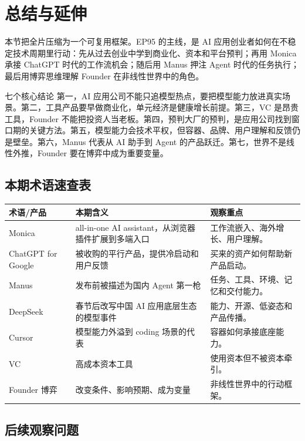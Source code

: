\documentclass[a4paper]{article}
\begin{document}
\section{总结与延伸}

本节把全片压缩为一个可复用框架。EP95 的主线，是 AI 应用创业者如何在不稳定技术周期里行动：先从过去创业中学到商业化、资本和平台预判；再用 Monica 承接 ChatGPT 时代的工作流机会；随后用 Manus 押注 Agent 时代的任务执行；最后用博弈思维理解 Founder 在非线性世界中的角色。

\begin{importantbox}{七个核心结论}
第一，AI 应用公司不能只追模型热点，要把模型能力放进真实场景。第二，工具产品要早做商业化，单元经济是健康增长前提。第三，VC 是昂贵工具，Founder 不能把投资人当老板。第四，预判大厂的预判，是应用公司找到窗口期的关键方法。第五，模型能力会技术平权，但容器、品牌、用户理解和反馈仍是壁垒。第六，Manus 代表从 AI 助手到 Agent 的产品跃迁。第七，世界不是线性外推，Founder 要在博弈中成为重要变量。
\end{importantbox}

\subsection{本期术语速查表}

\noindent\begin{tabularx}{\textwidth}{p{}p{}X}
\toprule
术语/产品 & 本期含义 & 观察重点 \\
\midrule
Monica & all-in-one AI assistant，从浏览器插件扩展到多端入口 & 工作流嵌入、海外增长、用户理解。 \\
ChatGPT for Google & 被收购的平行产品，提供冷启动和用户反馈 & 买来的资产如何帮助新产品启动。 \\
Manus & 发布前被描述为国内 Agent 第一枪 & 任务、工具、环境、记忆和交付能力。 \\
DeepSeek & 春节后改写中国 AI 应用底层生态的模型事件 & 能力、开源、低姿态和产品传播。 \\
Cursor & 模型能力外溢到 coding 场景的代表 & 容器如何承接底座能力。 \\
VC & 高成本资本工具 & 使用资本但不被资本牵引。 \\
Founder 博弈 & 改变条件、影响预期、成为变量 & 非线性世界中的行动框架。 \\
\bottomrule
\end{tabularx}

\subsection{后续观察问题}
\end{document}
